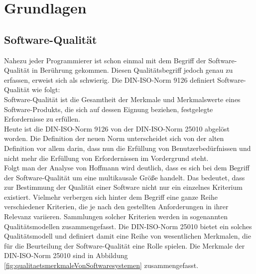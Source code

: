 \chapter{Grundlagen}
\label{sec:grundlagen}


\section{Software-Qualität}
\label{sec:softwarequalität}

Nahezu jeder Programmierer ist schon einmal mit dem Begriff der Software-Qualität in Berührung gekommen. Diesen Qualitätsbegriff jedoch genau zu erfassen, erweist sich als schwierig.
Die DIN-ISO-Norm 9126 definiert Software-Qualität wie folgt:
\\
\glqq Software-Qualität ist die Gesamtheit der Merkmale und Merkmalswerte eines Software-Produkts, die sich auf dessen Eignung beziehen, festgelegte Erfordernisse zu erfüllen.\grqq \cite{iso/iec_iso/iec_2001}
\\
Heute ist die DIN-ISO-Norm 9126 von der DIN-ISO-Norm 25010 \cite{iso/iec_iso/iec_2011} abgelöst worden. Die Definition der neuen Norm unterscheidet sich von der alten Definition vor allem darin, dass nun die Erfüllung von Benutzerbedürfnissen und nicht mehr die Erfüllung von Erfordernissen im Vordergrund steht.\\
Folgt man der Analyse von Hoffmann \cite[vgl. S.6 ff.]{hoffmann_software-qualitat_2013} wird deutlich, dass es sich bei dem Begriff der Software-Qualität um eine multikausale Größe handelt. Das bedeutet, dass zur Bestimmung der Qualität einer Software nicht nur ein einzelnes Kriterium existiert. Vielmehr verbergen sich hinter dem Begriff eine ganze Reihe verschiedener Kriterien, die je nach den gestellten Anforderungen in ihrer Relevanz variieren.
Sammlungen solcher Kriterien werden in sogenannten Qualitätsmodellen zusammengefasst. Die DIN-ISO-Norm 25010 \cite{iso/iec_iso/iec_2011} bietet ein solches Qualitätsmodell und definiert damit eine Reihe von wesentlichen Merkmalen, die für die Beurteilung der Software-Qualität eine Rolle spielen. Die Merkmale der DIN-ISO-Norm 25010 \cite{iso/iec_iso/iec_2011} sind in Abbildung \ref{fig:qualitaetsmerkmaleVonSoftwaresystemen} zusammengefasst.

